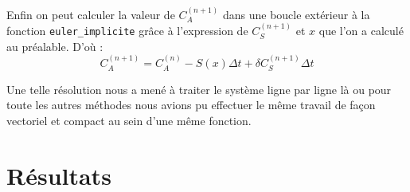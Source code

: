 \documentclass[12pt]{article}
\theoremstyle{saav}
\newcommand{\bk}{\bigskip}
\begin{document}
		\bk 
		
		Enfin on peut calculer la valeur de $C_{A}^{(n+1)}$ dans une boucle extérieur à la fonction \texttt{euler\_implicite} grâce à l'expression de $C_{S}^{(n+1)}$ et $x$ que l'on a calculé au préalable. D'où :
		\begin{equation*}
			C_{A}^{(n+1)} = C_{A}^{(n)} - S(x) \Delta t + \delta C_{S}^{(n+1)} \Delta t
		\end{equation*}
		
		Une telle résolution nous a mené à traiter le système ligne par ligne là ou pour toute les autres méthodes nous avions pu effectuer le même travail de façon vectoriel et compact au sein d'une même fonction. 
		
	\section{Résultats }
	
\end{document}
